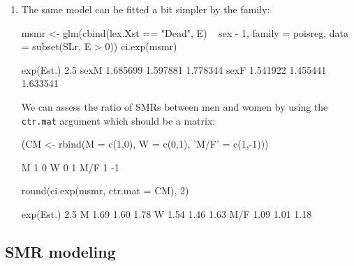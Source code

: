 \begin{enumerate}[resume]
\item The same model can be fitted a bit simpler by the  family:
\begin{Schunk}
\begin{Sinput}
 msmr <- glm(cbind(lex.Xst == "Dead", E) ~ sex - 1,
             family = poisreg,
               data = subset(SLr, E > 0))
 ci.exp(msmr)
\end{Sinput}
\begin{Soutput}
     exp(Est.)     2.5%    97.5%
sexM  1.685699 1.597881 1.778344
sexF  1.541922 1.455441 1.633541
\end{Soutput}
\end{Schunk}
  We can assess the ratio of SMRs between men and women by using the
  \texttt{ctr.mat} argument which should be a matrix:
\begin{Schunk}
\begin{Sinput}
 (CM <- rbind(M = c(1,0),
              W = c(0,1),
          'M/F' = c(1,-1)))
\end{Sinput}
\begin{Soutput}
    [,1] [,2]
M      1    0
W      0    1
M/F    1   -1
\end{Soutput}
\begin{Sinput}
 round(ci.exp(msmr, ctr.mat = CM), 2)
\end{Sinput}
\begin{Soutput}
    exp(Est.) 2.5% 97.5%
M        1.69 1.60  1.78
W        1.54 1.46  1.63
M/F      1.09 1.01  1.18
\end{Soutput}
\end{Schunk}

\end{enumerate}

\subsection{SMR modeling}

